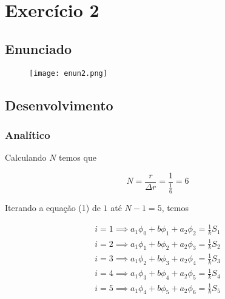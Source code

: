 \documentclass{article}
\begin{document}
    
    
    \newpage
    \section{Exercício 2}

        \subsection{Enunciado}
            \begin{figure}[ht]
                \centering
                \texttt{[image: enun2.png]}
                \centering 
                \label{nuclelink_fechado}
            \end{figure}

        \subsection{Desenvolvimento}

            \subsubsection{Analítico}

                Calculando $N$ temos que

                \begin{equation}
                    N = \frac{r}{\Delta r} = \frac{1}{\frac{1}{6}} = 6
                \end{equation}

                Iterando a equação (1) de $1$ até $N-1 = 5$, temos

                \begin{eqnarray}
                    i=1 \implies a_1 \phi_0 + b \phi_1 + a_2 \phi_2 = \frac{1}{k} S_1 \nonumber \\
                    i=2 \implies a_1 \phi_1 + b \phi_2 + a_2 \phi_3 = \frac{1}{k} S_2 \nonumber \\
                    i=3 \implies a_1 \phi_2 + b \phi_3 + a_2 \phi_4 = \frac{1}{k} S_3 \nonumber \\
                    i=4 \implies a_1 \phi_3 + b \phi_4 + a_2 \phi_5 = \frac{1}{k} S_4 \nonumber \\
                    i=5 \implies a_1 \phi_4 + b \phi_5 + a_2 \phi_6 = \frac{1}{k} S_5
                \end{eqnarray}
\end{document}

